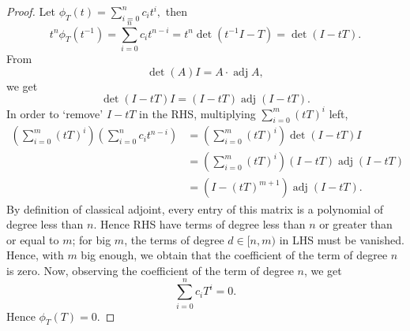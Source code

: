\begin{proof} Let $\phi_T(t) = \sum_{i=0}^n c_i t^i,$ then
  $$t^n \phi_T(t^{-1}) = \sum_{i=0}^n c_i t^{n-i}
  = t^n \operatorname{det}\left( t^{-1}I-T \right)
  = \operatorname{det}(I-tT).$$
From $$\operatorname{det}(A)I = A \cdot \operatorname{adj}A,$$
we get $$\operatorname{det}(I-tT)I = (I-tT)\operatorname{adj}(I-tT).$$
In order to `remove' $I-tT$ in the RHS, multiplying $\sum_{i=0}^m(tT)^i $ left,
$$\begin{aligned}\left(\sum_{i=0}^m (tT)^i \right) \left(\sum_{i=0}^n c_i t^{n-i}\right) &=
\left(\sum_{i=0}^m (tT)^i \right) \operatorname{det}(I-tT)I \\ &=
 \left(\sum_{i=0}^m (tT)^i \right) (I-tT)\operatorname{adj}(I-tT) \\ &
 = \left(I-(tT)^{m+1} \right) \operatorname{adj}(I-tT).\end{aligned}$$
By definition of classical adjoint, every entry of this matrix is a polynomial
of degree less than $n$. Hence RHS have terms of degree less than $n$ or greater
than or equal to $m$; for big $m$, the terms of degree $d\in [n,m)$ in LHS must
be vanished. Hence, with $m$ big enough, we obtain that the coefficient of the term of degree $n$ is zero. Now, observing the coefficient
of the term of degree $n$, we get
$$\sum_{i=0}^n c_i T^i = 0.$$
Hence $\phi_T(T) = 0.$
\end{proof}


